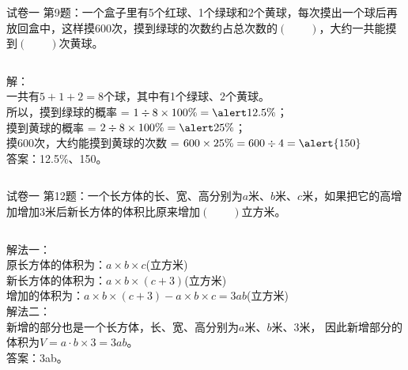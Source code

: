 \documentclass[aspectratio=169]{ctexbeamer} %
\begin{document}
\begin{frame}[t]{试卷一}
第9题：一个盒子里有5个红球、1个绿球和2个黄球，每次摸出一个球后再放回盒中，这样摸600次，摸到绿球的次数约占总次数的$(\qquad)$，大约一共能摸到$(\qquad)$次黄球。
\pause
\begin{columns}
\pause
解：\\
一共有$5 + 1 + 2 = 8$个球，其中有1个绿球、2个黄球。\\
所以，摸到绿球的概率 = $1 \div 8 \times 100\% = \alert{12.5\%}$；\\
\pause
摸到黄球的概率 = $2 \div 8 \times 100\% = \alert{25\%}$；\\
摸600次，大约能摸到黄球的次数  = $600 \times 25\% = 600 \div 4 = \alert{150}$ \\
答案：\alert{12.5\%}、\alert{150}。
\end{columns}
\end{frame}

\begin{frame}[t]{试卷一}
第12题：一个长方体的长、宽、高分别为$a$米、$b$米、$c$米，如果把它的高增加增加3米后新长方体的体积比原来增加$(\qquad)$立方米。
\pause
\vspace{1em}
\begin{columns}
解法一：\\
原长方体的体积为：$a \times b \times c$(立方米) \\
新长方体的体积为：$a \times b \times (c+3)$(立方米) \\
增加的体积为：$a \times b \times (c+3) - a \times b \times c = 3ab$(立方米) \\
\pause
\vspace{1em}
解法二：\\
新增的部分也是一个长方体，长、宽、高分别为$a$米、$b$米、$3$米，
因此新增部分的体积为$V = a \cdot b \times 3 = 3ab$。\\
答案：\alert{3ab}。\\
\end{columns}
\end{frame}
\end{document}

